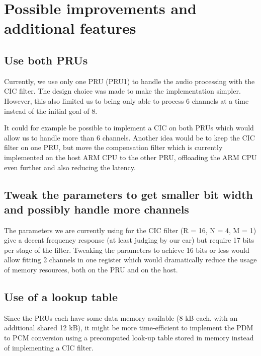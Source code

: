 \documentclass[]{report}
\begin{document}
\hypertarget{possible-improvements-and-additional-features}{%
\chapter{Possible improvements and additional
features}\label{possible-improvements-and-additional-features}}

\hypertarget{use-both-prus}{%
\section{Use both PRUs}\label{use-both-prus}}

Currently, we use only one PRU (PRU1) to handle the audio processing
with the CIC filter. The design choice was made to make the
implementation simpler. However, this also limited us to being only able
to process 6 channels at a time instead of the initial goal of 8.

It could for example be possible to implement a CIC on both PRUs which
would allow us to handle more than 6 channels. Another idea would be to
keep the CIC filter on one PRU, but move the compensation filter which
is currently implemented on the host ARM CPU to the other PRU,
offloading the ARM CPU even further and also reducing the latency.

\hypertarget{tweak-the-parameters-to-get-smaller-bit-width-and-possibly-handle-more-channels}{%
\section{Tweak the parameters to get smaller bit width and possibly
handle more
channels}\label{tweak-the-parameters-to-get-smaller-bit-width-and-possibly-handle-more-channels}}

The parameters we are currently using for the CIC filter (R = 16, N = 4,
M = 1) give a decent frequency response (at least judging by our ear)
but require 17 bits per stage of the filter. Tweaking the parameters to
achieve 16 bits or less would allow fitting 2 channels in one register
which would dramatically reduce the usage of memory resources, both on
the PRU and on the host.

\hypertarget{use-of-a-lookup-table}{%
\section{Use of a lookup table}\label{use-of-a-lookup-table}}

Since the PRUs each have some data memory available (8 kB each, with an
additional shared 12 kB), it might be more time-efficient to implement
the PDM to PCM conversion using a precomputed look-up table stored in
memory instead of implementing a CIC filter.
\end{document}
